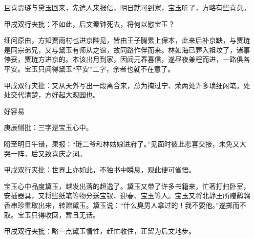 \begin{parag}


    且喜贾琏与黛玉回来，先遣人来报信，明日就可到家，宝玉听了，方略有些喜意。\begin{note}甲戌双行夹批：不如此，后文秦钟死去，将何以慰宝玉？\end{note}细问原由，方知贾雨村也进京陛见，皆由王子腾累上保本，此来后补京缺，与贾琏是同宗弟兄，又与黛玉有师从之谊，故同路作伴而来。林如海已葬入祖坟了，诸事停妥，贾琏方进京的。本该出月到家，因闻元春喜信，遂昼夜兼程而进，一路俱各平安。宝玉只闻得黛玉“平安”二字，余者也就不在意了。\begin{note}甲戌双行夹批：又从天外写出一段离合来，总为掩过宁、荣两处许多琐细闲笔。处处交代清楚，方好起大观园也。\end{note}
\end{parag}


\begin{parag}


    好容易\begin{note}庚辰侧批：三字是宝玉心中。\end{note}盼至明日午错，果报：“琏二爷和林姑娘进府了。”见面时彼此悲喜交接，未免又大哭一阵，后又致喜庆之词。\begin{note}甲戌双行夹批：世界上亦如此，不独书中瞬息，观此便可省悟。\end{note}宝玉心中品度黛玉，越发出落的超逸了。黛玉又带了许多书籍来，忙著打扫卧室，安插器具，又将些纸笔等物分送宝钗、迎春、宝玉等人。宝玉又将北静王所赠鹡鸰香串珍重取出来，转赠黛玉。黛玉说：“什么臭男人拿过的！我不要他。”遂掷而不取。宝玉只得收回，暂且无话。\begin{note}甲戌双行夹批：略一点黛玉情性，赶忙收住，正留为后文地步。\end{note}
\end{parag}


